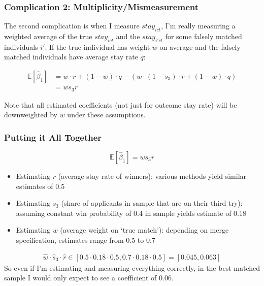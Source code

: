 \documentclass[xcolor=dvipsnames, compress, 12pt, aspectratio=169, handout]{beamer}
\begin{document}
\begin{frame}
    \frametitle{Complication 2: Multiplicity/Mismeasurement}
    The second complication is when I measure $stay_{ict}$, I'm really measuring a weighted average of the true $stay_{ict}$ and the $stay_{i'ct}$ for some falsely matched individuals $i'$. If the true individual has weight $w$ on average and the falsely matched individuals have average stay rate $q$:

    \begin{align*}
        \mathbb{E}[\hat{\beta}_1] &= w\cdot r + (1-w) \cdot q - (w \cdot (1-s_3) \cdot r + (1-w) \cdot q) \\ 
        &= w s_3 r
    \end{align*}

    Note that all estimated coefficients (not just for outcome stay rate) will be downweighted by $w$ under these assumptions.
\end{frame}

\begin{frame}
    \frametitle{Putting it All Together}
    \begin{equation*}
        \mathbb{E}[\hat{\beta}_1] = w s_3 r
    \end{equation*}
    \begin{itemize}
        \item Estimating $r$ (average stay rate of winners): various methods yield similar estimates of 0.5
        \item Estimating $s_3$ (share of applicants in sample that are on their third try): assuming constant win probability of $0.4$ in sample yields estimate of 0.18
        \item Estimating $w$ (average weight on `true match'): depending on merge specification, estimates range from 0.5 to 0.7
    \end{itemize}
    \begin{align*}
        \hat{w} \cdot \hat{s}_3 \cdot \hat{r} \in [0.5 \cdot 0.18 \cdot 0.5, 0.7 \cdot 0.18 \cdot 0.5] = [0.045, 0.063]
    \end{align*}
    So even if I'm estimating and measuring everything correctly, in the best matched sample I would only expect to see a coefficient of $0.06$.
\end{frame}
\end{document}
